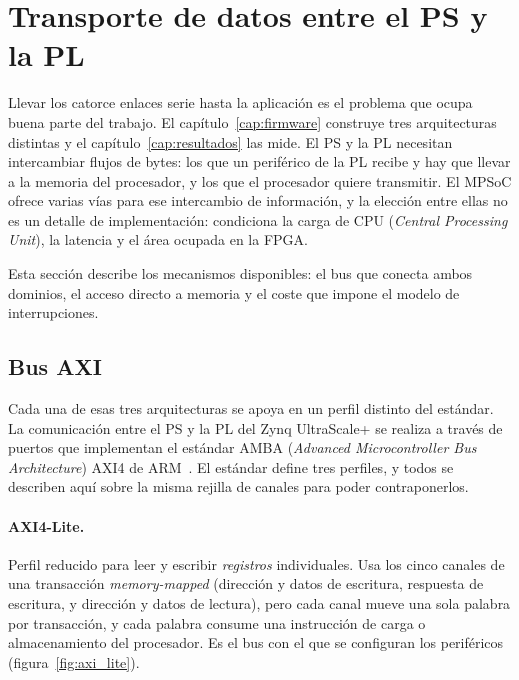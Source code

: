 
\section{Transporte de datos entre el PS y la PL}

Llevar los catorce enlaces serie hasta la aplicación es el problema que ocupa buena parte del
trabajo. El capítulo~\ref{cap:firmware} construye tres arquitecturas distintas y el
capítulo~\ref{cap:resultados} las mide. El PS y la PL necesitan intercambiar flujos de bytes: los que un periférico de la PL recibe y hay
que llevar a la memoria del procesador, y los que el procesador quiere transmitir. El MPSoC
ofrece varias vías para ese intercambio de información, y la elección entre ellas no es un detalle de
implementación: condiciona la carga de CPU (\textit{Central Processing Unit}), la latencia y el
área ocupada en la FPGA.

Esta sección describe los mecanismos disponibles: el bus que conecta ambos dominios, el acceso
directo a memoria y el coste que impone el modelo de interrupciones.

\subsection{Bus AXI}

Cada una de esas tres arquitecturas se apoya en un perfil distinto del estándar. La comunicación entre el PS y la PL del Zynq UltraScale+ se realiza a través de puertos que
implementan el estándar AMBA (\textit{Advanced Microcontroller Bus Architecture}) AXI4 de
ARM~\cite{arm2011axi4}. El estándar define tres perfiles, y todos se describen aquí sobre la misma
rejilla de canales para poder contraponerlos.

\paragraph{AXI4-Lite.}
Perfil reducido para leer y escribir \textit{registros} individuales. Usa los cinco canales de una
transacción \textit{memory-mapped} (dirección y datos de escritura, respuesta de escritura, y
dirección y datos de lectura), pero cada canal mueve una sola palabra por transacción, y cada
palabra consume una instrucción de carga o almacenamiento del procesador. Es el bus con el que se
configuran los periféricos (figura~\ref{fig:axi_lite}).

